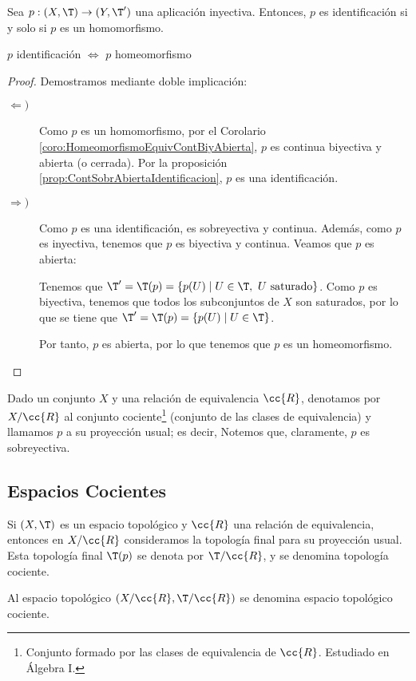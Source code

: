 \begin{prop}
    Sea $p:(X,\T)\to (Y,\T')$ una aplicación inyectiva. Entonces, $p$ es identificación si y solo si $p$ es un homomorfismo.
    \begin{center}
        $p$ identificación $\Longleftrightarrow$ $p$ homeomorfismo
    \end{center}
\end{prop}
\begin{proof} Demostramos mediante doble implicación:
    \begin{description}
        \item[$\Longleftarrow)$] Como $p$ es un homomorfismo, por el Corolario \ref{coro:HomeomorfismoEquivContBiyAbierta}, $p$ es continua biyectiva y abierta (o cerrada). Por la proposición \ref{prop:ContSobrAbiertaIdentificacion}, $p$ es una identificación. 

        \item[$\Longrightarrow)$] Como $p$ es una identificación, es sobreyectiva y continua. Además, como $p$ es inyectiva, tenemos que $p$ es biyectiva y continua. Veamos que $p$ es abierta:

        Tenemos que $\T'=\T(p) = \{p(U)\mid U\in \T,~ U\text{ saturado}\}$. Como $p$ es biyectiva, tenemos que todos los subconjuntos de $X$ son saturados, por lo que se tiene que $\T'=\T(p) = \{p(U)\mid U\in \T\}$.

        Por tanto, $p$ es abierta, por lo que tenemos que $p$ es un homeomorfismo.
    \end{description}
\end{proof}

\begin{notacion}
    Dado un conjunto $X$ y una relación de equivalencia $\cc{R}$, denotamos por $ X/\cc{R}$ al conjunto cociente\footnote{Conjunto formado por las clases de equivalencia de $\cc{R}$. Estudiado en Álgebra I.} (conjunto de las clases de equivalencia) y llamamos $p$ a su proyección usual; es decir,
    Notemos que, claramente, $p$ es sobreyectiva.
\end{notacion}

\subsection{Espacios Cocientes}
\begin{definicion}
    Si $(X,\T)$ es un espacio topológico y $\cc{R}$ una relación de equivalencia, entonces en $X/\cc{R}$ consideramos la topología final para su proyección usual. Esta topología final $\T(p)$ se denota por $\T/\cc{R}$, y se denomina topología cociente.

    Al espacio topológico $(X/\cc{R}, \T/\cc{R})$ se denomina espacio topológico cociente.
\end{definicion}

